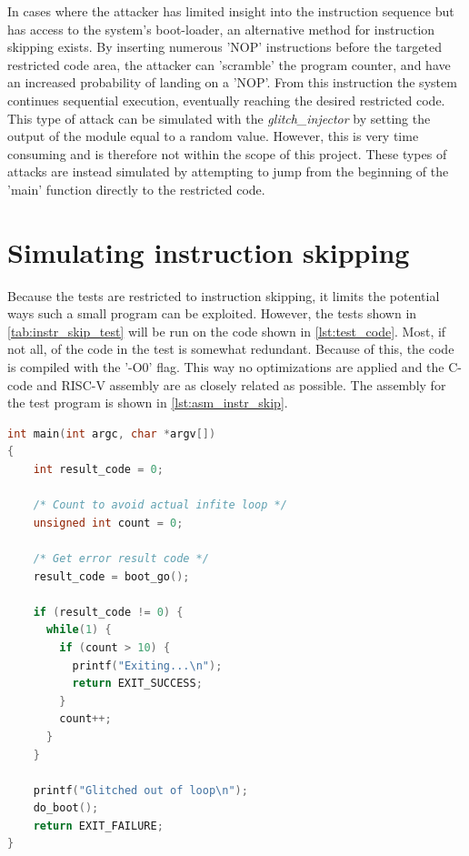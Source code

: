 In cases where the attacker has limited insight into the instruction sequence but has access to the system's boot-loader, an alternative method for instruction skipping exists. By inserting numerous 'NOP' instructions before the targeted restricted code area, the attacker can 'scramble' the program counter, and have an increased probability of landing on a 'NOP'. From this instruction the system continues sequential execution, eventually reaching the desired restricted code. This type of attack can be simulated with the \textit{glitch\_injector} by setting the output of the module equal to a random value. However, this is very time consuming and is therefore not within the scope of this project. These types of attacks are instead simulated by attempting to jump from the beginning of the 'main' function directly to the restricted code. 

\section{Simulating instruction skipping}
\label{sec:sim_instr_skip}

Because the tests are restricted to instruction skipping, it limits the potential ways such a small program can be exploited. However, the tests shown in \autoref{tab:instr_skip_test} will be run on the code shown in \autoref{lst:test_code}. Most, if not all, of the code in the test is somewhat redundant. Because of this, the code is compiled with the '-O0' flag. This way no optimizations are applied and the C-code and RISC-V assembly are as closely related as possible. The assembly for the test program is shown in \autoref{lst:asm_instr_skip}. 

\begin{lstlisting}[caption={Test code for simulating instruction skip.}, label=lst:test_code, language=C++]
int main(int argc, char *argv[])
{
    int result_code = 0;

    /* Count to avoid actual infite loop */
    unsigned int count = 0;

    /* Get error result code */
    result_code = boot_go();

    if (result_code != 0) {
      while(1) {
       	if (count > 10)	{
          printf("Exiting...\n");
       	  return EXIT_SUCCESS;
        }
        count++;
      }
    }

    printf("Glitched out of loop\n");
    do_boot();
    return EXIT_FAILURE;
}
\end{lstlisting}

